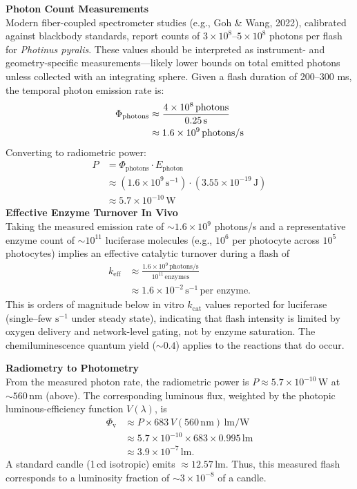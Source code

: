 \begin{technical}
\noindent\textbf{Photon Count Measurements}\\
Modern fiber-coupled spectrometer studies (e.g., Goh \& Wang, 2022), calibrated against blackbody standards, report counts of 
$3 \times 10^8$–$5 \times 10^8$ photons per flash for \textit{Photinus pyralis}. These values should be interpreted as instrument- and geometry-specific measurements—likely lower bounds on total emitted photons unless collected with an integrating sphere. Given a flash duration of 200–300 ms, the temporal photon emission rate is:
\begin{align*}
\Phi_{\text{photons}} &\approx 
\frac{4 \times 10^8\,\text{photons}}{0.25\,\text{s}} \notag\\
&\approx 1.6 \times 10^9\,\text{photons/s}
\end{align*}
Converting to radiometric power:
\begin{align*}
P &= \Phi_{\text{photons}} \cdot E_{\text{photon}} \\
  &\approx (1.6 \times 10^9\,\text{s}^{-1}) \cdot (3.55 \times 10^{-19}\,\text{J}) \\
  &\approx 5.7 \times 10^{-10}\,\text{W}
\end{align*}
\noindent\textbf{Effective Enzyme Turnover In Vivo}\\
Taking the measured emission rate of $\sim 1.6 \times 10^9$ photons/s and a representative enzyme count of $\sim 10^{11}$ luciferase molecules (e.g., $10^6$ per photocyte across $10^5$ photocytes) implies an effective catalytic turnover during a flash of
\begin{align*}
 k_{\text{eff}} &\approx \frac{1.6 \times 10^9\,\text{photons/s}}{10^{11}\,\text{enzymes}} \\
 &\approx 1.6 \times 10^{-2}\,\text{s}^{-1}\,\text{per enzyme.}
\end{align*}
This is orders of magnitude below in vitro $k_\text{cat}$ values reported for luciferase (single–few $\text{s}^{-1}$ under steady state), indicating that flash intensity is limited by oxygen delivery and network-level gating, not by enzyme saturation. The chemiluminescence quantum yield (\(\sim 0.4\)) applies to the reactions that do occur.

\noindent\textbf{Radiometry to Photometry}\\
From the measured photon rate, the radiometric power is $P \approx 5.7 \times 10^{-10}\,\text{W}$ at $\sim 560\,\text{nm}$ (above). The corresponding luminous flux, weighted by the photopic luminous-efficiency function $V(\lambda)$, is
\begin{align*}
\Phi_\text{v} &\approx P \times 683\,V(560\,\text{nm})\,\text{lm/W} \\
&\approx 5.7 \times 10^{-10} \times 683 \times 0.995\,\text{lm} \\
&\approx 3.9 \times 10^{-7}\,\text{lm}.
\end{align*}
A standard candle (1\,cd isotropic) emits $\approx 12.57$\,lm. Thus, this measured flash corresponds to a luminosity fraction of $\sim 3\times 10^{-8}$ of a candle. 


\end{technical}

